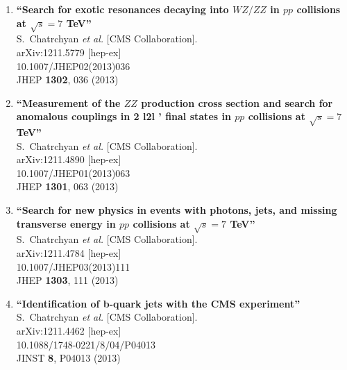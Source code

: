 \documentclass{article}
\begin{document}
\begin{enumerate}
\item%
{\bf ``Search for exotic resonances decaying into $WZ/ZZ$ in $pp$ collisions at $\sqrt{s}=7$ TeV''}
  \\{}S.~Chatrchyan {\it et al.}  [CMS Collaboration].
  \\{}arXiv:1211.5779 [hep-ex]
    \\{}10.1007/JHEP02(2013)036
\\{}JHEP {\bf 1302}, 036 (2013) %


\item%
{\bf ``Measurement of the $ZZ$ production cross section and search for anomalous couplings in 2 l2l ' final states in $pp$ collisions at $\sqrt{s}=7$ TeV''}
  \\{}S.~Chatrchyan {\it et al.}  [CMS Collaboration].
  \\{}arXiv:1211.4890 [hep-ex]
    \\{}10.1007/JHEP01(2013)063
\\{}JHEP {\bf 1301}, 063 (2013) %


\item%
{\bf ``Search for new physics in events with photons, jets, and missing transverse energy in $pp$ collisions at $\sqrt{s}=7$ TeV''}
  \\{}S.~Chatrchyan {\it et al.}  [CMS Collaboration].
  \\{}arXiv:1211.4784 [hep-ex]
    \\{}10.1007/JHEP03(2013)111
\\{}JHEP {\bf 1303}, 111 (2013) %


\item%
{\bf ``Identification of b-quark jets with the CMS experiment''}
  \\{}S.~Chatrchyan {\it et al.}  [CMS Collaboration].
  \\{}arXiv:1211.4462 [hep-ex]
    \\{}10.1088/1748-0221/8/04/P04013
\\{}JINST {\bf 8}, P04013 (2013) %



\end{enumerate}
\end{document}
